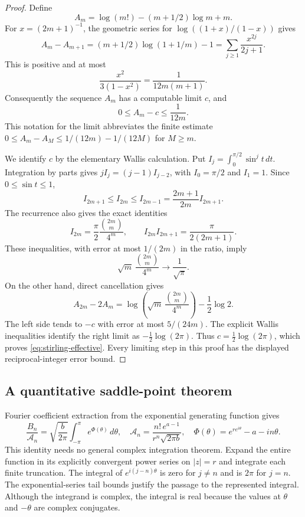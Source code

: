 \begin{proof}
Define
\[
 A_m=\log(m!)-(m+1/2)\log m+m.
\]
For $x=(2m+1)^{-1}$, the geometric series for
$\log((1+x)/(1-x))$ gives
\[
 A_m-A_{m+1}
 =(m+1/2)\log(1+1/m)-1
 =\sum_{j\geq1}\frac{x^{2j}}{2j+1}.
\]
This is positive and at most
\[
 \frac{x^2}{3(1-x^2)}=\frac1{12m(m+1)}.
\]
Consequently the sequence $A_m$ has a computable limit $c$, and
\[
 0\leq A_m-c\leq\frac1{12m}.
\]
This notation for the limit abbreviates the finite estimate
$0\leq A_m-A_M\leq1/(12m)-1/(12M)$ for $M\geq m$.

We identify $c$ by the elementary Wallis calculation.  Put
$I_j=\int_0^{\pi/2}\sin^j t\,dt$.  Integration by parts gives
$jI_j=(j-1)I_{j-2}$, with $I_0=\pi/2$ and $I_1=1$.
Since $0\leq\sin t\leq1$,
\[
 I_{2m+1}\leq I_{2m}\leq I_{2m-1}
 =\frac{2m+1}{2m}I_{2m+1}.
\]
The recurrence also gives the exact identities
\[
 I_{2m}=\frac\pi2\frac{\binom{2m}{m}}{4^m},
 \qquad I_{2m}I_{2m+1}=\frac\pi{2(2m+1)}.
\]
These inequalities, with error at most $1/(2m)$ in the ratio, imply
\[
 \sqrt m\,\frac{\binom{2m}{m}}{4^m}\longrightarrow\frac1{\sqrt\pi}.
\]
On the other hand, direct cancellation gives
\[
 A_{2m}-2A_m
 =\log\left(\sqrt m\,\frac{\binom{2m}{m}}{4^m}\right)
 -\frac12\log2.
\]
The left side tends to $-c$ with error at most $5/(24m)$.
The explicit Wallis inequalities identify the right limit as
$-\tfrac12\log(2\pi)$.  Thus $c=\tfrac12\log(2\pi)$, which proves
\eqref{eq:stirling-effective}.  Every limiting step in this proof has
the displayed reciprocal-integer error bound.
\end{proof}

\subsection{A quantitative saddle-point theorem}

Fourier coefficient extraction from the exponential generating
function gives
\begin{equation}\label{eq:growth-fourier}
 \frac{B_n}{\mathcal A_n}
 =\sqrt{\frac b{2\pi}}\int_{-\pi}^{\pi}e^{\Phi(\theta)}\,d\theta,
 \quad
 \mathcal A_n=\frac{n!\,e^{a-1}}{r^n\sqrt{2\pi b}},
 \quad
 \Phi(\theta)=e^{r e^{i\theta}}-a-in\theta.
\end{equation}
This identity needs no general complex integration theorem.  Expand
the entire function in its explicitly convergent power series on
$|z|=r$ and integrate each finite truncation.  The integral of
$e^{i(j-n)\theta}$ is zero for $j\ne n$ and is $2\pi$ for $j=n$.
The exponential-series tail bounds justify the passage to the
represented integral.  Although the integrand is complex, the
integral is real because the values at $\theta$ and $-\theta$ are
complex conjugates.


